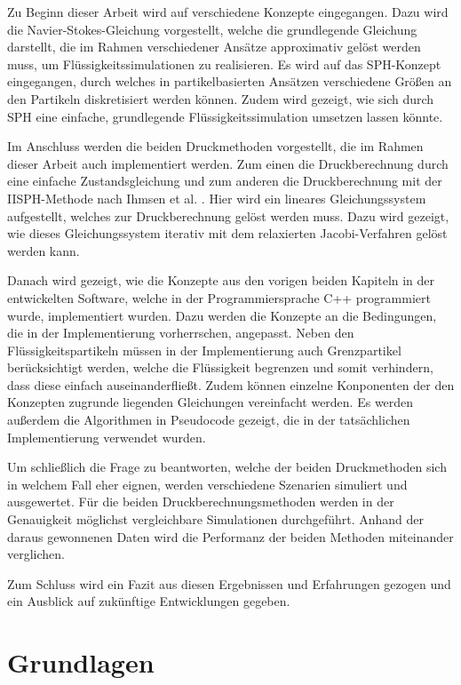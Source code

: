 \documentclass[11pt,
a4paper,
parskip=half, %
BCOR=10mm, %
english,
ngerman]{scrreprt}
\begin{document}
Zu Beginn dieser Arbeit wird auf verschiedene Konzepte eingegangen.
Dazu wird die Navier-Stokes-Gleichung vorgestellt, welche die grundlegende Gleichung darstellt,
die im Rahmen verschiedener Ansätze approximativ gelöst werden muss, um Flüssigkeitssimulationen zu realisieren.
Es wird auf das SPH-Konzept eingegangen, durch welches in partikelbasierten Ansätzen verschiedene Größen an den Partikeln diskretisiert werden können.
Zudem wird gezeigt, wie sich durch SPH eine einfache, grundlegende Flüssigkeitssimulation umsetzen lassen könnte.

Im Anschluss werden die beiden Druckmethoden vorgestellt, die im Rahmen dieser Arbeit auch implementiert werden.
Zum einen die Druckberechnung durch eine einfache Zustandsgleichung
und zum anderen die Druckberechnung mit der IISPH-Methode nach Ihmsen et al. \cite{ihmsen_implicit_2014}.
Hier wird ein lineares Gleichungssystem aufgestellt, welches zur Druckberechnung gelöst werden muss.
Dazu wird gezeigt, wie dieses Gleichungssystem iterativ mit dem relaxierten Jacobi-Verfahren gelöst werden kann.

Danach wird gezeigt, wie die Konzepte aus den vorigen beiden Kapiteln in der entwickelten Software, welche in der Programmiersprache C++ programmiert wurde,
implementiert wurden. Dazu werden die Konzepte an die Bedingungen, die in der Implementierung vorherrschen, angepasst.
Neben den Flüssigkeitspartikeln müssen in der Implementierung auch Grenzpartikel berücksichtigt werden,
welche die Flüssigkeit begrenzen und somit verhindern, dass diese einfach auseinanderfließt.
Zudem können einzelne Konponenten der den Konzepten zugrunde liegenden Gleichungen vereinfacht werden.
Es werden außerdem die Algorithmen in Pseudocode gezeigt, die in der tatsächlichen Implementierung verwendet wurden.

Um schließlich die Frage zu beantworten, welche der beiden Druckmethoden sich in welchem Fall eher eignen, werden verschiedene Szenarien simuliert und ausgewertet.
Für die beiden Druckberechnungsmethoden werden in der Genauigkeit möglichst vergleichbare Simulationen durchgeführt.
Anhand der daraus gewonnenen Daten wird die Performanz der beiden Methoden miteinander verglichen.

Zum Schluss wird ein Fazit aus diesen Ergebnissen und Erfahrungen gezogen und ein Ausblick auf zukünftige Entwicklungen gegeben.


\chapter{Grundlagen}
\end{document}
